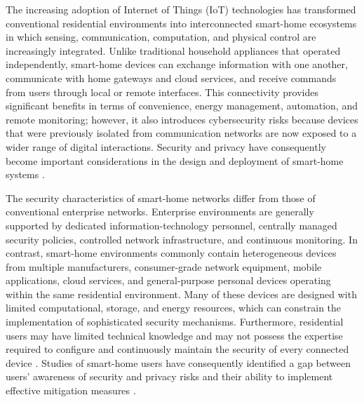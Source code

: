 The increasing adoption of Internet of Things (IoT) technologies has transformed conventional residential environments into interconnected smart-home ecosystems in which sensing, communication, computation, and physical control are increasingly integrated. Unlike traditional household appliances that operated independently, smart-home devices can exchange information with one another, communicate with home gateways and cloud services, and receive commands from users through local or remote interfaces. This connectivity provides significant benefits in terms of convenience, energy management, automation, and remote monitoring; however, it also introduces cybersecurity risks because devices that were previously isolated from communication networks are now exposed to a wider range of digital interactions. Security and privacy have consequently become important considerations in the design and deployment of smart-home systems \citep{haneySmartHomeSecurity2020}.

The security characteristics of smart-home networks differ from those of conventional enterprise networks. Enterprise environments are generally supported by dedicated information-technology personnel, centrally managed security policies, controlled network infrastructure, and continuous monitoring. In contrast, smart-home environments commonly contain heterogeneous devices from multiple manufacturers, consumer-grade network equipment, mobile applications, cloud services, and general-purpose personal devices operating within the same residential environment. Many of these devices are designed with limited computational, storage, and energy resources, which can constrain the implementation of sophisticated security mechanisms. Furthermore, residential users may have limited technical knowledge and may not possess the expertise required to configure and continuously maintain the security of every connected device \citep{haneySmartHomeSecurity2020,faganProfileIoTCore2022,megasRecommendedCybersecurityRequirements2024}. Studies of smart-home users have consequently identified a gap between users' awareness of security and privacy risks and their ability to implement effective mitigation measures \citep{haneySmartHomeSecurity2020}.

